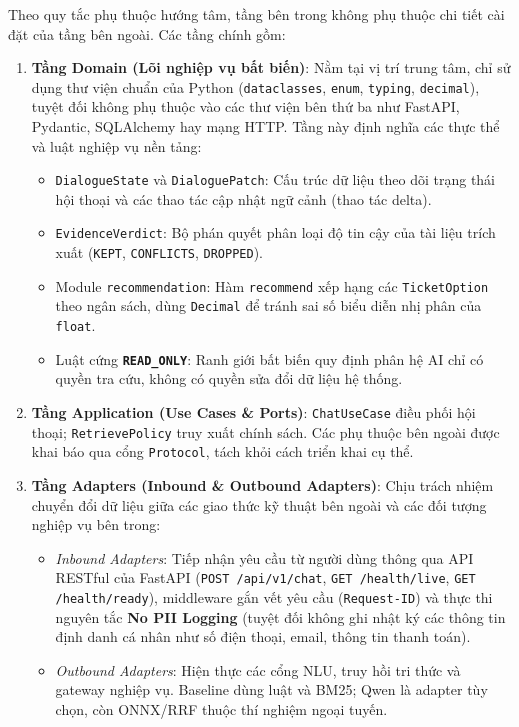 Theo quy tắc phụ thuộc hướng tâm, tầng bên trong không phụ thuộc chi tiết cài đặt của tầng bên ngoài. Các tầng chính gồm:
\begin{enumerate}[nosep]
  \item \textbf{Tầng Domain (Lõi nghiệp vụ bất biến)}: Nằm tại vị trí trung tâm, chỉ sử dụng thư viện chuẩn của Python (\texttt{dataclasses}, \texttt{enum}, \texttt{typing}, \texttt{decimal}), tuyệt đối không phụ thuộc vào các thư viện bên thứ ba như FastAPI, Pydantic, SQLAlchemy hay mạng HTTP. Tầng này định nghĩa các thực thể và luật nghiệp vụ nền tảng:
  \begin{itemize}[nosep]
    \item \texttt{DialogueState} và \texttt{DialoguePatch}: Cấu trúc dữ liệu theo dõi trạng thái hội thoại và các thao tác cập nhật ngữ cảnh (thao tác delta).
    \item \texttt{EvidenceVerdict}: Bộ phán quyết phân loại độ tin cậy của tài liệu trích xuất (\texttt{KEPT}, \texttt{CONFLICTS}, \texttt{DROPPED}).
    \item Module \texttt{recommendation}: Hàm \texttt{recommend} xếp hạng các \texttt{TicketOption} theo ngân sách, dùng \texttt{Decimal} để tránh sai số biểu diễn nhị phân của \texttt{float}.
    \item Luật cứng \textbf{\texttt{READ\_ONLY}}: Ranh giới bất biến quy định phân hệ AI chỉ có quyền tra cứu, không có quyền sửa đổi dữ liệu hệ thống.
  \end{itemize}
  \item \textbf{Tầng Application (Use Cases \& Ports)}: \texttt{ChatUseCase} điều phối hội thoại; \texttt{RetrievePolicy} truy xuất chính sách. Các phụ thuộc bên ngoài được khai báo qua cổng \texttt{Protocol}, tách khỏi cách triển khai cụ thể.
  \item \textbf{Tầng Adapters (Inbound \& Outbound Adapters)}: Chịu trách nhiệm chuyển đổi dữ liệu giữa các giao thức kỹ thuật bên ngoài và các đối tượng nghiệp vụ bên trong:
  \begin{itemize}[nosep]
    \item \textit{Inbound Adapters}: Tiếp nhận yêu cầu từ người dùng thông qua API RESTful của FastAPI (\texttt{POST /api/v1/chat}, \texttt{GET /health/live}, \texttt{GET /health/ready}), middleware gắn vết yêu cầu (\texttt{Request-ID}) và thực thi nguyên tắc \textbf{No PII Logging} (tuyệt đối không ghi nhật ký các thông tin định danh cá nhân như số điện thoại, email, thông tin thanh toán).
    \item \textit{Outbound Adapters}: Hiện thực các cổng NLU, truy hồi tri thức và gateway nghiệp vụ. Baseline dùng luật và BM25; Qwen là adapter tùy chọn, còn ONNX/RRF thuộc thí nghiệm ngoại tuyến.
  \end{itemize}
\end{enumerate}

